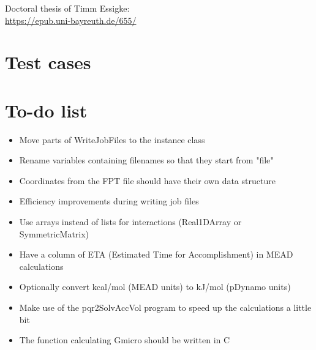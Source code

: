 \documentclass[a4paper,11pt]{article}
\begin{document}
Doctoral thesis of Timm Essigke:\\
\url{https://epub.uni-bayreuth.de/655/}


\section{Test cases}


\section{To-do list}
\begin{itemize}
  \setlength{\itemsep}{2pt}
  \item Move parts of WriteJobFiles to the instance class
  \item Rename variables containing filenames so that they start from "file"
  \item Coordinates from the FPT file should have their own data structure
  \item Efficiency improvements during writing job files
  \item Use arrays instead of lists for interactions (Real1DArray or SymmetricMatrix)
  \item Have a column of ETA (Estimated Time for Accomplishment) in MEAD calculations
  \item Optionally convert kcal/mol (MEAD units) to kJ/mol (pDynamo units)
  \item Make use of the pqr2SolvAccVol program to speed up the calculations a little bit
  \item The function calculating Gmicro should be written in C
\end{itemize}
\end{document}
